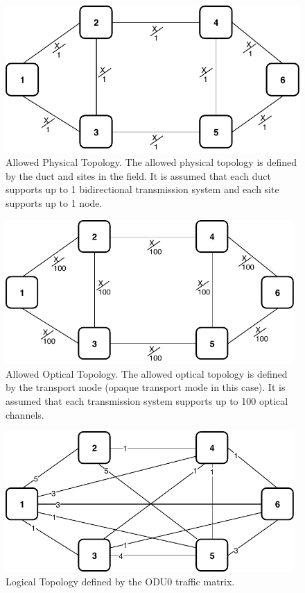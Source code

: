 \vspace{11pt}
\begin{figure}[h!]
\centering
\includegraphics[width=12cm]{sdf/ilp/opaque_protection/figures/allowed_physical_topology}
\caption{Allowed Physical Topology. The allowed physical topology is defined by the duct and sites in the field. It is assumed that each duct supports up to 1 bidirectional transmission system and each site supports up to 1 node.}
\label{allowed_physical_protectionlow}
\end{figure}
\newpage
\begin{figure}[h!]
\centering
\includegraphics[width=11cm]{sdf/ilp/opaque_protection/figures/allowed_optical_topology}
\caption{Allowed Optical Topology. The allowed optical topology is defined by the transport mode (opaque transport mode in this case). It is assumed that each transmission system supports up to 100 optical channels.}
\label{allowed_optical_protectionlow}
\end{figure}

\begin{figure}[h!]
\centering
\includegraphics[width=11cm]{sdf/ilp/opaque_protection/figures/logical_topology_ODU0_low}
\caption{Logical Topology defined by the ODU0 traffic matrix.}
\label{logical_ODU0_protectionlow}
\end{figure}

